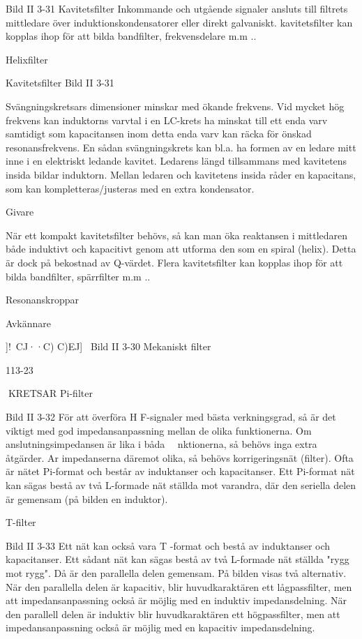 \documentclass[a4paper,twoside,twocolumn,openright]{book}
\begin{document}
{{{{{{{Bild II 3-31 Kavitetsfilter
Inkommande och utgående signaler ansluts till filtrets mittledare över induktionskondensatorer eller direkt galvaniskt.
kavitetsfilter kan kopplas ihop för att
bilda bandfilter, frekvensdelare m.m ..

Helixfilter

Kavitetsfilter
Bild II 3-31

Svängningskretsars dimensioner minskar
med ökande frekvens. Vid mycket hög frekvens kan induktorns varvtal i en LC-krets ha
minskat till ett enda varv samtidigt som kapacitansen inom detta enda varv kan räcka
för önskad resonansfrekvens.
En sådan svängningskrets kan bl.a. ha
formen av en ledare mitt inne i en elektriskt
ledande kavitet. Ledarens längd tillsammans
med kavitetens insida bildar induktorn. Mellan ledaren och kavitetens insida råder en
kapacitans, som kan kompletteras/justeras
med en extra kondensator.

Givare

När ett kompakt kavitetsfilter behövs, så kan
man öka reaktansen i mittledaren både induktivt och kapacitivt genom att utforma den
som en spiral (helix). Detta är dock på bekostnad av Q-värdet. Flera kavitetsfilter kan
kopplas ihop för att bilda bandfilter, spärrfilter m.m ..

Resonanskroppar

Avkännare

]!~CJ··C) C)EJ]~
Bild II 3-30 Mekaniskt filter

113-23

KRETSAR
Pi-filter

Bild II 3-32
För att överföra H F-signaler med bästa verkningsgrad, så är det viktigt med god impedansanpassning mellan de olika funktionerna. Om anslutningsimpedansen är lika i båda
~~nktionerna, så behövs inga extra åtgärder.
Ar impedanserna däremot olika, så behövs
korrigeringsnät (filter).
Ofta är nätet Pi-format och består av
induktanser och kapacitanser. Ett Pi-format
nät kan sägas bestå av två L-formade nät
ställda mot varandra, där den seriella delen
är gemensam (på bilden en induktor).

T-filter

Bild II 3-33
Ett nät kan också vara T -format och bestå av
induktanser och kapacitanser. Ett sådant
nät kan sägas bestå av två L-formade nät
ställda "rygg mot rygg". Då är den parallella
delen gemensam. På bilden visas två alternativ.
När den parallella delen är kapacitiv, blir
huvudkaraktären ett lågpassfilter, men att
impedansanpassning också är möjlig med
en induktiv impedansdelning.
När den parallell delen är induktiv blir
huvudkaraktären ett högpassfilter, men att
impedansanpassning också är möjlig med
en kapacitiv impedansdelning.

}}}}}}}
\end{document}
